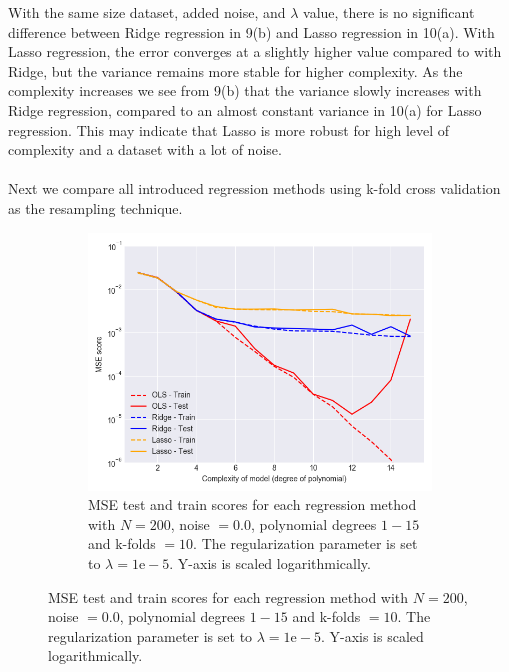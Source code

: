 \documentclass[a4paper,twocolumn]{article}
\begin{document}
With the same size dataset, added noise, and $\lambda$ value, there is no significant difference between Ridge regression in 9(b) and Lasso regression in 10(a). With Lasso regression, the error converges at a slightly higher value compared to with Ridge, but the variance remains more stable for higher complexity. As the complexity increases we see from 9(b) that the variance slowly increases with Ridge regression, compared to an almost constant variance in 10(a) for Lasso regression. This may indicate that Lasso is more robust for high level of complexity and a dataset with a lot of noise.\\
\\
Next we compare all introduced regression methods using k-fold cross validation as the resampling technique.
\begin{figure}[ht]
    \centering
    \begin{subfigure}[b]{0.9\columnwidth}
        \includegraphics[width=\columnwidth]{OLS_Ridge_Lasso_comparison_Lambda=1e-05_N=200_Noise=0.0_Degree=1-15.png}
        \caption{MSE test and train scores for each regression method with $N = 200$, noise $= 0.0$, polynomial degrees $1- 15$ and k-folds $= 10$. The regularization parameter is set to $\lambda = 1\textrm{e}-5$. Y-axis is scaled logarithmically.}
    \end{subfigure}
    

\end{figure}
\end{document}
